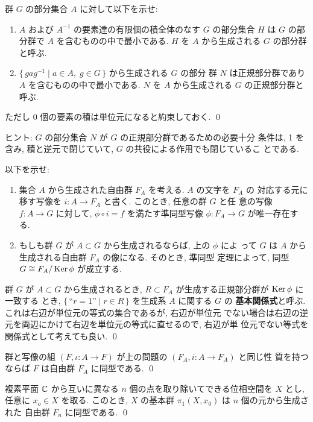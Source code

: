 \documentclass[12pt,twoside]{jarticle}
\def\C{{\Bbb C}} %
\def\Ker{\mathop{\text{\rm Ker}}\nolimits}   %
\def\isom{\cong}
\begin{document}
\begin{question}
  群 $G$ の部分集合 $A$ に対して以下を示せ:
  \begin{enumerate}
  \item $A$ および $A^{-1}$ の要素達の有限個の積全体のなす $G$ の部分集合
    $H$ は $G$ の部分群で $A$ を含むものの中で最小である.
    $H$ を $A$ から生成される $G$ の部分群と呼ぶ.
  \item $\{\, gag^{-1} \mid a\in A,\; g\in G \,\}$ から生成される $G$ の部分
    群 $N$ は正規部分群であり $A$ を含むものの中で最小である.
    $N$ を $A$ から生成される $G$ の正規部分群と呼ぶ.
  \end{enumerate}
  ただし $0$ 個の要素の積は単位元になると約束しておく. \qed
\end{question}

\noindent ヒント: $G$ の部分集合 $N$ が $G$ の正規部分群であるための必要十分
条件は, 1 を含み, 積と逆元で閉じていて, $G$ の共役による作用でも閉じているこ
とである.

\begin{question}[基本関係式]
  以下を示せ:
  \begin{enumerate}
  \item 集合 $A$ から生成された自由群 $F_A$ を考える. $A$ の文字を $F_A$ の
    対応する元に移す写像を $i:A\to F_A$ と書く.  このとき, 任意の群 $G$ と任
    意の写像 $f:A\to G$ に対して, 
    $\phi\circ i = f$ を満たす準同型写像 $\phi:F_A\to G$ が唯一存在する.
  \item もしも群 $G$ が $A\subset G$ から生成されるならば, 上の $\phi$ によ
    って $G$ は $A$ から生成される自由群 $F_A$ の像になる.  そのとき, 準同型
    定理によって, 同型 $G \isom F_A/\Ker\phi$ が成立する.
  \end{enumerate}
  群 $G$ が $A\subset G$ から生成されるとき, 
  $R\subset F_A$ が生成する正規部分群が $\Ker\phi$ に一致する
  とき, $\{\,\text{``$r = 1$''}\mid r\in R\,\}$ を生成系 $A$ に関する $G$ の
  {\bf 基本関係式}と呼ぶ. これは右辺が単位元の等式の集合であるが, 右辺が単位元
  でない場合は右辺の逆元を両辺にかけて右辺を単位元の等式に直せるので, 右辺が単
  位元でない等式を関係式として考えても良い.
  \qed
\end{question}

\begin{question}
  群と写像の組 $(F, \iota:A\to F)$ が上の問題の $(F_A, i:A\to F_A)$ と同じ性
  質を持つならば $F$ は自由群 $F_A$ に同型である. \qed
\end{question}

\begin{question}
  複素平面 $\C$ から互いに異なる $n$ 個の点を取り除いてできる位相空間を $X$ 
  とし, 任意に $x_o\in X$ を取る. 
  このとき, $X$ の基本群 $\pi_1(X,x_0)$ は $n$ 個の元から生成された
  自由群 $F_n$ に同型である. 
  \qed
\end{question}
\end{document}
